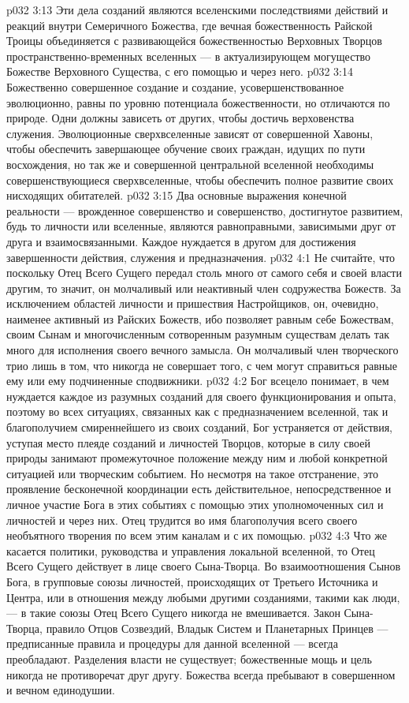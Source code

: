 \vs p032 3:13 Эти дела созданий являются вселенскими последствиями действий и реакций внутри Семеричного Божества, где вечная божественность Райской Троицы объединяется с развивающейся божественностью Верховных Творцов пространственно\hyp{}временных вселенных --- в актуализирующем могущество Божестве Верховного Существа, с его помощью и через него.
\vs p032 3:14 Божественно совершенное создание и создание, усовершенствованное эволюционно, равны по уровню потенциала божественности, но отличаются по природе. Одни должны зависеть от других, чтобы достичь верховенства служения. Эволюционные сверхвселенные зависят от совершенной Хавоны, чтобы обеспечить завершающее обучение своих граждан, идущих по пути восхождения, но так же и совершенной центральной вселенной необходимы совершенствующиеся сверхвселенные, чтобы обеспечить полное развитие своих нисходящих обитателей.
\vs p032 3:15 Два основные выражения конечной реальности --- врожденное совершенство и совершенство, достигнутое развитием, будь то личности или вселенные, являются равноправными, зависимыми друг от друга и взаимосвязанными. Каждое нуждается в другом для достижения завершенности действия, служения и предназначения.
\vs p032 4:1 Не считайте, что поскольку Отец Всего Сущего передал столь много от самого себя и своей власти другим, то значит, он молчаливый или неактивный член содружества Божеств. За исключением областей личности и пришествия Настройщиков, он, очевидно, наименее активный из Райских Божеств, ибо позволяет равным себе Божествам, своим Сынам и многочисленным сотворенным разумным существам делать так много для исполнения своего вечного замысла. Он молчаливый член творческого трио лишь в том, что никогда не совершает того, с чем могут справиться равные ему или ему подчиненные сподвижники.
\vs p032 4:2 Бог всецело понимает, в чем нуждается каждое из разумных созданий для своего функционирования и опыта, поэтому во всех ситуациях, связанных как с предназначением вселенной, так и благополучием смиреннейшего из своих созданий, Бог устраняется от действия, уступая место плеяде созданий и личностей Творцов, которые в силу своей природы занимают промежуточное положение между ним и любой конкретной ситуацией или творческим событием. Но несмотря на такое отстранение, это проявление бесконечной координации есть действительное, непосредственное и личное участие Бога в этих событиях с помощью этих уполномоченных сил и личностей и через них. Отец трудится во имя благополучия всего своего необъятного творения по всем этим каналам и с их помощью.
\vs p032 4:3 \pc Что же касается политики, руководства и управления локальной вселенной, то Отец Всего Сущего действует в лице своего Сына\hyp{}Творца. Во взаимоотношения Сынов Бога, в групповые союзы личностей, происходящих от Третьего Источника и Центра, или в отношения между любыми другими созданиями, такими как люди, --- в такие союзы Отец Всего Сущего никогда не вмешивается. Закон Сына\hyp{}Творца, правило Отцов Созвездий, Владык Систем и Планетарных Принцев --- предписанные правила и процедуры для данной вселенной --- всегда преобладают. Разделения власти не существует; божественные мощь и цель никогда не противоречат друг другу. Божества всегда пребывают в совершенном и вечном единодушии.
